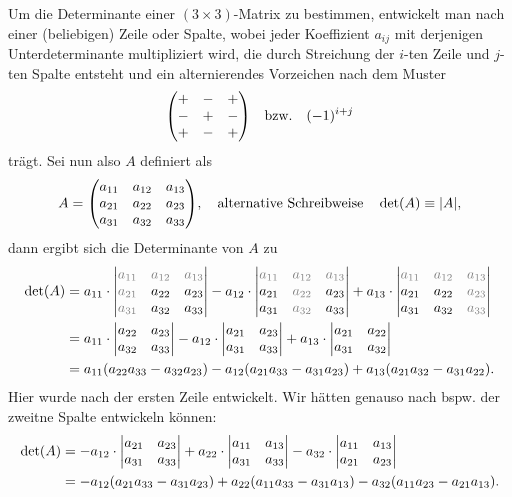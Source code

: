 Um die Determinante einer $(3\times 3)$-Matrix zu bestimmen, entwickelt man nach einer (beliebigen) Zeile oder Spalte, wobei jeder Koeffizient $a_{ij}$ mit derjenigen Unterdeterminante multipliziert wird, die durch Streichung der $i$-ten Zeile und $j$-ten Spalte entsteht und ein alternierendes Vorzeichen nach dem Muster 
\begin{align}
    \mqty(+ & - & + \\ - & + & - \\ + & - & +) \qq{bzw.} (-1)^{i+j}
\end{align}
trägt. Sei nun also $A$ definiert als 
\begin{align}
    A = \mqty(a_{11} & a_{12} & a_{13}\\ a_{21} & a_{22} & a_{23} \\ a_{31} & a_{32} & a_{33}), \qq{alternative Schreibweise} \det(A) \equiv |A|,
\end{align}
dann ergibt sich die Determinante von $A$ zu 
\begin{align}
    \det(A) &= a_{11} \cdot \mqty|\textcolor{gray}{a_{11}} & \textcolor{gray}{a_{12}} & \textcolor{gray}{a_{13}}\\ \textcolor{gray}{a_{21}} & a_{22} & a_{23} \\ \textcolor{gray}{a_{31}} & a_{32} & a_{33}| - a_{12} \cdot \mqty|\textcolor{gray}{a_{11}} & \textcolor{gray}{a_{12}} & \textcolor{gray}{a_{13}}\\ a_{21} & \textcolor{gray}{a_{22}} & a_{23} \\ a_{31} & \textcolor{gray}{a_{32}} & a_{33}| + a_{13} \cdot \mqty|\textcolor{gray}{a_{11}} & \textcolor{gray}{a_{12}} & \textcolor{gray}{a_{13}}\\ a_{21} & a_{22} & \textcolor{gray}{a_{23}} \\ a_{31} & a_{32} & \textcolor{gray}{a_{33}}| \notag \\
    &= a_{11} \cdot \mqty|a_{22} & a_{23} \\ a_{32} & a_{33}| - a_{12} \cdot \mqty|a_{21} & a_{23} \\ a_{31} & a_{33}| + a_{13} \cdot \mqty|a_{21} & a_{22} \\ a_{31} & a_{32}| \notag \\
    &= a_{11} (a_{22}a_{33}-a_{32}a_{23}) - a_{12}(a_{21}a_{33}-a_{31}a_{23}) + a_{13} (a_{21}a_{32}-a_{31}a_{22}).
\end{align}
Hier wurde nach der ersten Zeile entwickelt. Wir hätten genauso nach bspw. der zweitne Spalte entwickeln können:
\begin{align}
    \det(A) &= -a_{12} \cdot \mqty|a_{21} & a_{23} \\ a_{31} & a_{33}| + a_{22} \cdot \mqty|a_{11} & a_{13} \\ a_{31} & a_{33}| - a_{32} \cdot \mqty|a_{11} & a_{13} \\ a_{21} & a_{23}| \notag \\
    &= -a_{12} (a_{21}a_{33}-a_{31}a_{23}) + a_{22}(a_{11}a_{33}-a_{31}a_{13}) - a_{32} (a_{11}a_{23}-a_{21}a_{13}).
\end{align}
